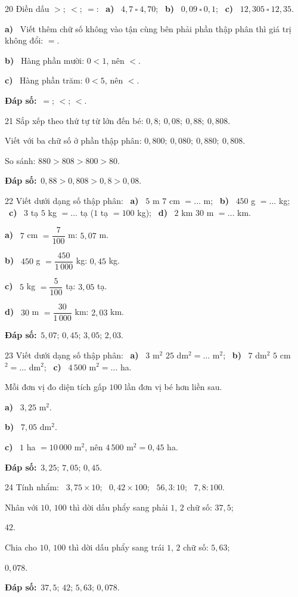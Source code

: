 \documentclass[11pt]{article}
\newif\ifsol \solfalse
\providecommand{\AnsWord}{Đáp số}
\newcommand{\dapso}[1]{\par\textbf{\AnsWord:}\ #1}
\newcommand{\probsol}[1]{%
  \begin{lrbox}{\solmeasure}\begin{minipage}{\dimexpr\linewidth-24pt\relax}#1\end{minipage}\end{lrbox}%
  \ifsol
    \begin{solbox}#1\end{solbox}%
  \else
    \setlength{\solht}{\dimexpr\ht\solmeasure+\dp\solmeasure+0.85cm\relax}%
    \ifdim\solht<1.35cm\setlength{\solht}{1.35cm}\fi
    \begin{tcolorbox}[colback=white,colframe=Line,boxrule=0.8pt,arc=5pt,
      left=8pt,right=8pt,top=4pt,bottom=4pt,height=\solht]{\footnotesize\color{Slate}\itshape\WorkWord}\end{tcolorbox}%
  \fi}
\newcommand{\pa}[1]{\textbf{#1)}\ }
\newcommand{\gap}{\vspace{0.3cm}}
\def\WorkWord{Bài làm:}
\def\AnsWord{Đáp số}
\begin{document}
\gap
\begin{probbox}{20}{\relax}
Điền dấu $>;\ <;\ =$: \ \pa{a} $4{,}7\ \square\ 4{,}70$; \ \pa{b} $0{,}09\ \square\ 0{,}1$; \ \pa{c} $12{,}305\ \square\ 12{,}35$.
\end{probbox}
\probsol{
\pa{a} Viết thêm chữ số không vào tận cùng bên phải phần thập phân thì giá trị không đổi: $=$.\par \pa{b} Hàng phần mười: $0<1$, nên $<$.\par \pa{c} Hàng phần trăm: $0<5$, nên $<$.
\dapso{$=$; $<$; $<$.}}
\gap
\begin{probbox}{21}{\relax}
Sắp xếp theo thứ tự từ lớn đến bé: $0{,}8;\ 0{,}08;\ 0{,}88;\ 0{,}808$.
\end{probbox}
\probsol{
Viết với ba chữ số ở phần thập phân: $0{,}800;\ 0{,}080;\ 0{,}880;\ 0{,}808$.\par So sánh: $880>808>800>80$.
\dapso{$0{,}88>0{,}808>0{,}8>0{,}08$.}}
\gap
\begin{probbox}{22}{\relax}
Viết dưới dạng số thập phân: \ \pa{a} $5$ m $7$ cm $=\ldots$ m; \ \pa{b} $450$ g $=\ldots$ kg; \ \pa{c} $3$ tạ $5$ kg $=\ldots$ tạ ($1$ tạ $=100$ kg); \ \pa{d} $2$ km $30$ m $=\ldots$ km.
\end{probbox}
\probsol{
\pa{a} $7$ cm $=\dfrac7{100}$ m: $5{,}07$ m.\par \pa{b} $450$ g $=\dfrac{450}{1\,000}$ kg: $0{,}45$ kg.\par \pa{c} $5$ kg $=\dfrac5{100}$ tạ: $3{,}05$ tạ.\par \pa{d} $30$ m $=\dfrac{30}{1\,000}$ km: $2{,}03$ km.
\dapso{$5{,}07$; $0{,}45$; $3{,}05$; $2{,}03$.}}
\gap
\begin{probbox}{23}{\relax}
Viết dưới dạng số thập phân: \ \pa{a} $3$ m$^2$ $25$ dm$^2=\ldots$ m$^2$; \ \pa{b} $7$ dm$^2$ $5$ cm$^2=\ldots$ dm$^2$; \ \pa{c} $4\,500$ m$^2=\ldots$ ha.
\end{probbox}
\probsol{
Mỗi đơn vị đo diện tích gấp $100$ lần đơn vị bé hơn liền sau.\par \pa{a} $3{,}25$ m$^2$.\par \pa{b} $7{,}05$ dm$^2$.\par \pa{c} $1$ ha $=10\,000$ m$^2$, nên $4\,500$ m$^2=0{,}45$ ha.
\dapso{$3{,}25$; $7{,}05$; $0{,}45$.}}
\gap
\begin{probbox}{24}{\relax}
Tính nhẩm: \ $3{,}75\times10$; \ $0{,}42\times100$; \ $56{,}3:10$; \ $7{,}8:100$.
\end{probbox}
\probsol{
Nhân với $10$, $100$ thì dời dấu phẩy sang phải $1$, $2$ chữ số: $37{,}5$;\par $42$.\par Chia cho $10$, $100$ thì dời dấu phẩy sang trái $1$, $2$ chữ số: $5{,}63$;\par $0{,}078$.
\dapso{$37{,}5$; $42$; $5{,}63$; $0{,}078$.}}
\end{document}

